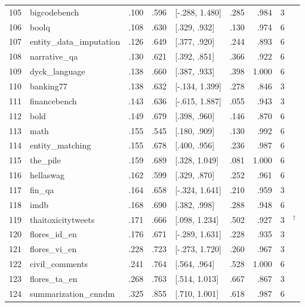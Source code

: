 \begin{longtable}{@{}r>{\raggedright\arraybackslash}p{}rrlrrr>{\raggedright\arraybackslash}p{}@{}}
105 & bigcodebench & .100 & .596 & [-.288, 1.480] & .285 & .984 & 3 & \citealp{zhuo2024bigcodebench} \\
106 & boolq & .108 & .630 & [.329, .932] & .130 & .974 & 6 & \citealp{clark2019boolq} \\
107 & entity\_data\_imputation & .126 & .649 & [.377, .920] & .244 & .893 & 6 & \citealp{helm2023} \\
108 & narrative\_qa & .130 & .621 & [.392, .851] & .366 & .922 & 6 & \citealp{kocisky2017narrativeqa} \\
109 & dyck\_language & .138 & .660 & [.387, .933] & .398 & 1.000 & 6 & \citealp{helm2023} \\
110 & banking77 & .138 & .632 & [-.134, 1.399] & .278 & .846 & 3 & \citealp{casanueva2020efficient} \\
111 & financebench & .143 & .636 & [-.615, 1.887] & .055 & .943 & 3 & \citealp{islam2023financebench} \\
112 & bold & .149 & .679 & [.398, .960] & .146 & .870 & 6 & \citealp{dhamala2021bold} \\
113 & math & .155 & .545 & [.180, .909] & .130 & .992 & 6 & \citealp{sobhani2025mathmist} \\
114 & entity\_matching & .155 & .678 & [.400, .956] & .236 & .987 & 6 & \citealp{helm2023} \\
115 & the\_pile & .159 & .689 & [.328, 1.049] & .081 & 1.000 & 6 & \citealp{gao2020pile} \\
116 & hellaswag & .162 & .599 & [.329, .870] & .252 & .961 & 6 & \citealp{zellers2019hellaswag} \\
117 & fin\_qa & .164 & .658 & [-.324, 1.641] & .210 & .959 & 3 & \citealp{chen2021finqa} \\
118 & imdb & .168 & .690 & [.382, .998] & .288 & .948 & 6 & \citealp{maas2011learning} \\
119 & thaitoxicitytweets & .171 & .666 & [.098, 1.234] & .502 & .927 & 3 & \citealp{susanto2025sea}$^\dagger$ \\
120 & flores\_id\_en & .176 & .671 & [-.289, 1.631] & .228 & .935 & 3 & \citealp{costajussa2022no} \\
121 & flores\_vi\_en & .228 & .723 & [-.273, 1.720] & .260 & .967 & 3 & \citealp{costajussa2022no} \\
122 & civil\_comments & .241 & .764 & [.564, .964] & .528 & 1.000 & 6 & \citealp{borkan2019nuanced} \\
123 & flores\_ta\_en & .268 & .763 & [.514, 1.013] & .667 & .867 & 3 & \citealp{costajussa2022no} \\
124 & summarization\_cnndm & .325 & .855 & [.710, 1.001] & .618 & .987 & 6 & \citealp{hermann2015teaching} \\
\end{longtable}
\endgroup
